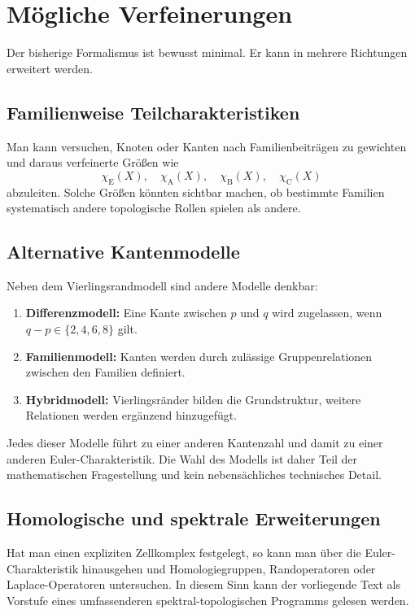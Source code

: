 \documentclass[11pt,a4paper]{article}
\theoremstyle{definition}
\theoremstyle{remark}
\newcommand{\Efam}{\mathrm{E}}
\newcommand{\Afam}{\mathrm{A}}
\newcommand{\Bfam}{\mathrm{B}}
\newcommand{\Cfam}{\mathrm{C}}
\begin{document}
	\section{Mögliche Verfeinerungen}
	
	Der bisherige Formalismus ist bewusst minimal. Er kann in mehrere Richtungen erweitert werden.
	
	\subsection{Familienweise Teilcharakteristiken}
	
	Man kann versuchen, Knoten oder Kanten nach Familienbeiträgen zu gewichten und daraus verfeinerte Größen wie
	\[
	\chi_\Efam(X),\quad \chi_\Afam(X),\quad \chi_\Bfam(X),\quad \chi_\Cfam(X)
	\]
	abzuleiten. Solche Größen könnten sichtbar machen, ob bestimmte Familien systematisch andere topologische Rollen spielen als andere.
	
	\subsection{Alternative Kantenmodelle}
	
	Neben dem Vierlingsrandmodell sind andere Modelle denkbar:
	\begin{enumerate}[label=(\alph*),itemsep=0.2em]
		\item \textbf{Differenzmodell:} Eine Kante zwischen $p$ und $q$ wird zugelassen, wenn $q-p\in\{2,4,6,8\}$ gilt.
		\item \textbf{Familienmodell:} Kanten werden durch zulässige Gruppenrelationen zwischen den Familien definiert.
		\item \textbf{Hybridmodell:} Vierlingsränder bilden die Grundstruktur, weitere Relationen werden ergänzend hinzugefügt.
	\end{enumerate}
	
	Jedes dieser Modelle führt zu einer anderen Kantenzahl und damit zu einer anderen Euler-Charakteristik. Die Wahl des Modells ist daher Teil der mathematischen Fragestellung und kein nebensächliches technisches Detail.
	
	\subsection{Homologische und spektrale Erweiterungen}
	
	Hat man einen expliziten Zellkomplex festgelegt, so kann man über die Euler-Charakteristik hinausgehen und Homologiegruppen, Randoperatoren oder Laplace-Operatoren untersuchen. In diesem Sinn kann der vorliegende Text als Vorstufe eines umfassenderen spektral-topologischen Programms gelesen werden.
	
\end{document}
